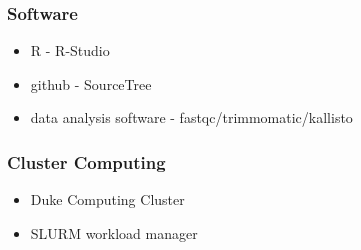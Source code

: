 \documentclass[14pt]{beamer}
\begin{document}
\begin{frame}
\frametitle{Software}
\begin{itemize}
	\item<1-> R - R-Studio
	\item<2-> github - SourceTree
	\item<3-> data analysis software - fastqc/trimmomatic/kallisto
\end{itemize}
\end{frame}
\begin{frame}
\frametitle{Cluster Computing}
\begin{itemize}
	\item Duke Computing Cluster
	\item SLURM workload manager
\end{itemize}
\end{frame}
\end{document}
